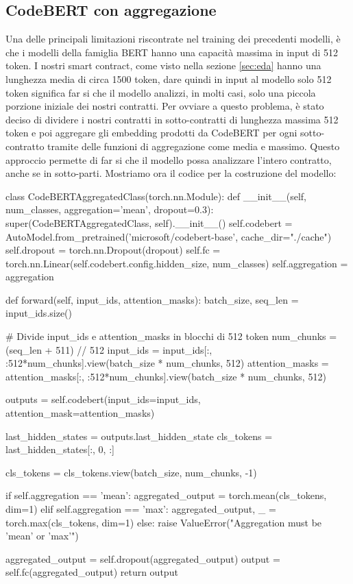\documentclass[../../Thesis.tex]{subfiles}
\begin{document}
\subsection{CodeBERT con aggregazione}
Una delle principali limitazioni riscontrate nel training dei precedenti modelli, \`e che i modelli della famiglia BERT hanno una capacit\`a massima in input di 512 token. I nostri smart contract, come visto nella sezione \ref{sec:eda} hanno una lunghezza media di circa 1500 token, dare quindi in input al modello solo 512 token significa far si che il modello analizzi, in molti casi, solo una piccola porzione iniziale dei nostri contratti. Per ovviare a questo problema, \`e stato deciso di dividere i nostri contratti in sotto-contratti di lunghezza massima 512 token e poi aggregare gli embedding prodotti da CodeBERT per ogni sotto-contratto tramite delle funzioni di aggregazione come media e massimo. Questo approccio permette di far si che il modello possa analizzare l'intero contratto, anche se in sotto-parti. Mostriamo ora il codice per la costruzione del modello: 
\begin{python}
    class CodeBERTAggregatedClass(torch.nn.Module):
        def __init__(self, num_classes, aggregation='mean', dropout=0.3):
            super(CodeBERTAggregatedClass, self).__init__()
            self.codebert = AutoModel.from_pretrained('microsoft/codebert-base', cache_dir="./cache")
            self.dropout = torch.nn.Dropout(dropout)
            self.fc = torch.nn.Linear(self.codebert.config.hidden_size, num_classes)
            self.aggregation = aggregation

        def forward(self, input_ids, attention_masks):
            batch_size, seq_len = input_ids.size()

            # Divide input_ids e attention_masks in blocchi di 512 token
            num_chunks = (seq_len + 511) // 512
            input_ids = input_ids[:, :512*num_chunks].view(batch_size * num_chunks, 512)
            attention_masks = attention_masks[:, :512*num_chunks].view(batch_size * num_chunks, 512)

            outputs = self.codebert(input_ids=input_ids, attention_mask=attention_masks)

            last_hidden_states = outputs.last_hidden_state
            cls_tokens = last_hidden_states[:, 0, :]

            cls_tokens = cls_tokens.view(batch_size, num_chunks, -1)

            if self.aggregation == 'mean':
                aggregated_output = torch.mean(cls_tokens, dim=1)
            elif self.aggregation == 'max':
                aggregated_output, _ = torch.max(cls_tokens, dim=1)
            else:
                raise ValueError("Aggregation must be 'mean' or 'max'")

            aggregated_output = self.dropout(aggregated_output)
            output = self.fc(aggregated_output)
            return output
\end{python}
\end{document}
